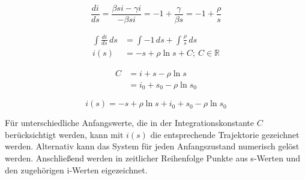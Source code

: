 \documentclass[../main.tex]{subfiles}
\begin{document}
        \begin{equation*}
                \frac{di}{ds} = \frac{\beta s i - \gamma i}{- \beta s i}
                              = -1 + \frac{\gamma}{\beta s}
                              = -1+ \frac{\rho}{s}
        \end{equation*}

        \begin{equation*}
            \begin{aligned}
                \int \frac{di}{ds}\,ds &= \int -1\,ds + \int \frac{\rho}{s}\,ds \\
                i(s)                   &= -s          + \rho \ln s + C;\ C \in \mathbb{R}
            \end{aligned}
        \end{equation*}

        \begin{equation*}
            \begin{split}
                C   &= i + s - \rho \ln s \\
                    &= i_0 + s_0 - \rho \ln s_0
            \end{split}
        \end{equation*}

        \begin{equation}
            \label{eq:trajectory}
            i(s) = -s + \rho \ln s + i_0 + s_0 - \rho \ln s_0
        \end{equation}

        Für unterschiedliche Anfangswerte, die in der Integrationskonstante $C$ berücksichtigt werden, kann mit $i(s)$ die entsprechende Trajektorie gezeichnet werden. Alternativ kann das System für jeden Anfangszustand numerisch gelöst werden. Anschließend werden in zeitlicher Reihenfolge Punkte aus s-Werten und den zugehörigen i-Werten eigezeichnet.
\end{document}
